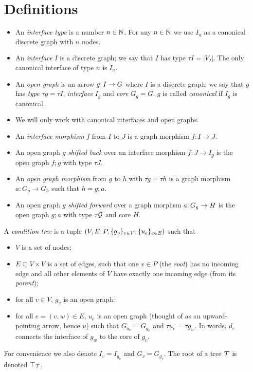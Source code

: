 \section{Definitions}
\label{sec:definitions}

\begin{itemize}
\item An \emph{interface type} is a number $n\in\mathbb{N}$. For any $n\in \mathbb{N}$ we use $I_n$ as a canonical discrete graph with $n$ nodes.

\item An \emph{interface} $I$ is a discrete graph; we say that $I$ has type $\tau I=|V_I|$. The only canonical interface of type $n$ is $I_n$.

\item An \emph{open graph} is an arrow $g{:}\, I\rightarrow G$ where $I$ is a discrete graph; we say that $g$ has \emph{type} $\tau g=\tau I$, \emph{interface} $I_g$ and \emph{core} $G_g=G$. $g$ is called \emph{canonical} if $I_g$ is canonical.

\item We will only work with canonical interfaces and open graphs. 

\item An \emph{interface morphism} $f$ from $I$ to $J$ is a graph morphism $f:I\to J$.

\item An open graph $g$ \emph{shifted back} over an interface morphism $f:J\to I_g$ is the open graph $f;g$ with type $\tau J$.

\item An \emph{open graph morphism} from $g$ to $h$ with $\tau g=\tau h$ is a graph morphism $a:G_g\to G_h$ such that $h=g;a$.

\item An open graph $g$ \emph{shifted forward} over a graph morphsm $a{:}\, G_g\rightarrow H$ is the open graph $g;a$ with type $\tau{\mathcal{G}}$ and core $H$.
\end{itemize}
%
A \emph{condition tree} is a tuple $(V,E,P,\{{g_v}\}_{v\in V},\{{u_e}\}_{e\in E})$ such that

\begin{itemize}
\item $V$ is a set of nodes;

\item $E\subseteq V\times V$ is a set of edges, such that one $v\in P$ (the \emph{root}) has no incoming edge and all other elements of $V$ have exactly one incoming edge (from its \emph{parent});

\item for all $v\in V$, $g_v$ is an open graph;

\item for all $e=(v,w)\in E$, $u_e$ is an open graph (thought of as an upward-pointing arrow, hence $u$) such that $G_{u_e}=G_{g_v}$ and $\tau u_e=\tau g_w$. In words, $d_e$ connects the interface of $g_w$ to the core of $g_v$.
\end{itemize}
%
For convenience we also denote $I_v=I_{g_v}$ and $G_v=G_{g_v}$. The root of a tree ${\mathcal{T}}$ is denoted $\top_{{\mathcal{T}}}$.

